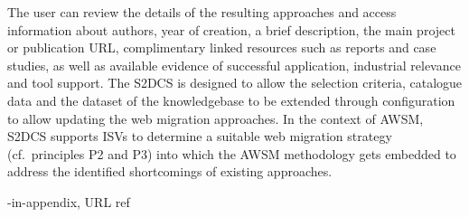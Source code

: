 The user can review the details of the resulting approaches and access information about authors, year of creation, a brief description, the main project or publication URL, complimentary linked resources such as reports and case studies, as well as available evidence of successful application, industrial relevance and tool support.
The S2DCS is designed to allow the selection criteria, catalogue data and the dataset of the knowledgebase to be extended through configuration to allow updating the web migration approaches.
In the context of AWSM, S2DCS supports ISVs to determine a suitable web migration strategy (cf.~principles P2 and P3) into which the AWSM methodology gets embedded to address the identified shortcomings of existing approaches.

-in-appendix, URL ref
